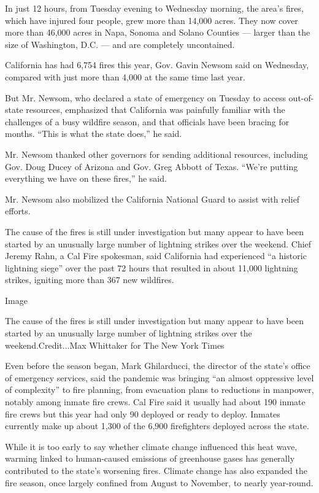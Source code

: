 In just 12 hours, from Tuesday evening to Wednesday morning, the area's
fires, which have injured four people, grew more than 14,000 acres. They
now cover more than 46,000 acres in Napa, Sonoma and Solano Counties ---
larger than the size of Washington, D.C. --- and are completely
uncontained.

California has had 6,754 fires this year, Gov. Gavin Newsom said on
Wednesday, compared with just more than 4,000 at the same time last
year.

But Mr. Newsom, who declared a state of emergency on Tuesday to access
out-of-state resources, emphasized that California was painfully
familiar with the challenges of a busy wildfire season, and that
officials have been bracing for months. ``This is what the state does,''
he said.

Mr. Newsom thanked other governors for sending additional resources,
including Gov. Doug Ducey of Arizona and Gov. Greg Abbott of Texas.
``We're putting everything we have on these fires,'' he said.

Mr. Newsom also mobilized the California National Guard to assist with
relief efforts.

The cause of the fires is still under investigation but many appear to
have been started by an unusually large number of lightning strikes over
the weekend. Chief Jeremy Rahn, a Cal Fire spokesman, said California
had experienced ``a historic lightning siege'' over the past 72 hours
that resulted in about 11,000 lightning strikes, igniting more than 367
new wildfires.

Image

The cause of the fires is still under investigation but many appear to
have been started by an unusually large number of lightning strikes over
the weekend.Credit...Max Whittaker for The New York Times

Even before the season began, Mark Ghilarducci, the director of the
state's office of emergency services, said the pandemic was bringing
``an almost oppressive level of complexity'' to fire planning, from
evacuation plans to reductions in manpower, notably among inmate fire
crews. Cal Fire said it usually had about 190 inmate fire crews but this
year had only 90 deployed or ready to deploy. Inmates currently make up
about 1,300 of the 6,900 firefighters deployed across the state.

While it is too early to say whether climate change influenced this heat
wave, warming linked to human-caused emissions of greenhouse gases has
generally contributed to the state's worsening fires. Climate change has
also expanded the fire season, once largely confined from August to
November, to nearly year-round.

